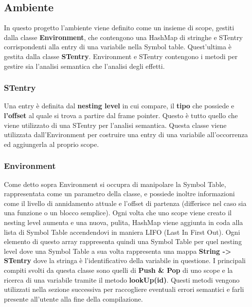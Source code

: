 \documentclass[../../main]{subfiles}
\begin{document}
\subsection{Ambiente}
In questo progetto l'ambiente viene definito come un insieme di scope, gestiti dalla classe \textbf{Environment}, che contengono una HashMap
di stringhe e STentry corrispondenti alla entry di una variabile nella Symbol table. Quest'ultima è gestita dalla classe \textbf{STentry}.
Environment e STentry contengono i metodi per gestire sia l'analisi semantica che l'analisi degli effetti.

\subsubsection{STentry}
Una entry è definita dal \textbf{nesting level} in cui compare, il \textbf{tipo} che possiede e \textbf{l'offset} al quale si trova a partire dal frame pointer.
Questo è tutto quello che viene utilizzato di una STentry per l'analisi semantica. Questa classe viene utilizzata dall'Environment per costruire una
entry di una variabile all'occorrenza ed aggiungerla al proprio scope.

\subsubsection{Environment}
Come detto sopra Environment si occupra di manipolare la Symbol Table, rappresentata come un parametro della classe, e possiede inoltre informazioni
come il livello di annidamento attuale e l'offset di partenza (differisce nel caso sia una funzione o un blocco semplice).
Ogni volta che uno scope viene creato il nesting level aumenta e una nuova, pulita, HashMap viene aggiunta in coda alla lista di Symbol Table
accendendovi in maniera LIFO (Last In First Out).
Ogni elemento di questo array rappresenta quindi una Symbol Table per quel nesting level dove una Symbol Table a sua volta rappresenta una mappa
\textbf{String -> STentry} dove la stringa è l'identificativo della variabile in questione.
I principali compiti svolti da questa classe sono quelli di \textbf{Push \& Pop} di uno scope e la ricerca di una variabile tramite il metodo
\textbf{lookUp(id)}. 
Questi metodi vengono utilizzati nella sezione successiva per raccogliere eventuali errori semantici e farli presente all'utente alla fine della compilazione.
\end{document}
